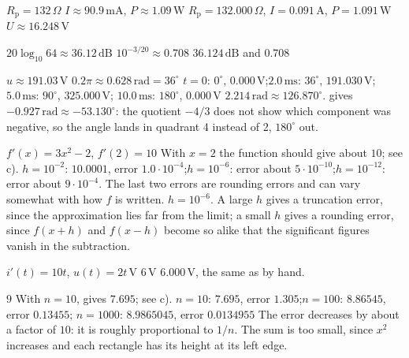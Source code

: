 
\begin{facit}

  $R_{\text{p}} = 132\,\Omega$
 $I \approx 90.9\,\text{mA}$, $P \approx 1.09\,\text{W}$
 $R_{\text{p}} = 132.000\,\Omega$, $I = 0.091\,\text{A}$, $P = 1.091\,\text{W}$
 $U \approx 16.248\,\text{V}$

  $20\log_{10} 64 \approx 36.12\,\text{dB}$  $10^{-3/20} \approx 0.708$
 $36.124\,\text{dB}$ and $0.708$

  $u \approx 191.03\,\text{V}$
 $0.2\pi \approx 0.628\,\text{rad} = 36^{\circ}$
 $t = 0$: $0^{\circ}$, $0.000\,\text{V}$;\enspace $2.0\,\text{ms}$: $36^{\circ}$,
$191.030\,\text{V}$;\enspace $5.0\,\text{ms}$: $90^{\circ}$, $325.000\,\text{V}$;\enspace
$10.0\,\text{ms}$: $180^{\circ}$, $0.000\,\text{V}$
 $2.214\,\text{rad} \approx 126.870^{\circ}$.  gives
$-0.927\,\text{rad} \approx -53.130^{\circ}$: the quotient $-4/3$ does not show which component
was negative, so the angle lands in quadrant 4 instead of 2, $180^{\circ}$ out.

  $f'(x) = 3x^2 - 2$, $f'(2) = 10$
 With $x = 2$ the function should give about $10$; see c).
 $h = 10^{-2}$: $10.0001$, error $1.0 \cdot 10^{-4}$;\enspace $h = 10^{-6}$: error about
$5 \cdot 10^{-10}$;\enspace $h = 10^{-12}$: error about $9 \cdot 10^{-4}$. The last two errors are
rounding errors and can vary somewhat with how $f$ is written.
 $h = 10^{-6}$. A large $h$ gives a truncation error, since the approximation lies far from
the limit; a small $h$ gives a rounding error, since $f(x + h)$ and $f(x - h)$ become so alike
that the significant figures vanish in the subtraction.

  $i'(t) = 10t$, $u(t) = 2t\,\text{V}$  $6\,\text{V}$
 $6.000\,\text{V}$, the same as by hand.

  $9$  With $n = 10$,  gives $7.695$; see c).
 $n = 10$: $7.695$, error $1.305$;\enspace $n = 100$: $8.86545$, error $0.13455$;\enspace
$n = 1000$: $8.9865045$, error $0.0134955$
 The error decreases by about a factor of $10$: it is roughly proportional to $1/n$. The sum
is too small, since $x^2$ increases and each rectangle has its height at its left edge.


\end{facit}
